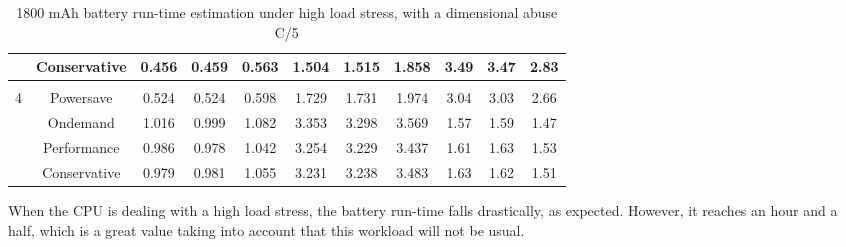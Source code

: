 \begin{table}[H]
\begin{tabular}{ccccccccccc}
\multicolumn{1}{l|}{}  & \multicolumn{1}{l}{Conservative} & \multicolumn{1}{l}{0.456} & \multicolumn{1}{l}{0.459} & \multicolumn{1}{l|}{{\color[HTML]{FE0000} 0.563}} & \multicolumn{1}{l}{1.504} & \multicolumn{1}{l}{1.515} & \multicolumn{1}{l|}{{\color[HTML]{FE0000} 1.858}} & \multicolumn{1}{l}{3.49} & \multicolumn{1}{l}{3.47} & \multicolumn{1}{l}{{\color[HTML]{FE0000} 2.83}} \\ \hline
\multicolumn{1}{l}{}   & \multicolumn{1}{l}{}             & \multicolumn{1}{l}{}      & \multicolumn{1}{l}{}      & \multicolumn{1}{l|}{{\color[HTML]{FE0000} }}      & \multicolumn{1}{l}{}      & \multicolumn{1}{l}{}      & \multicolumn{1}{l|}{{\color[HTML]{FE0000} }}      & \multicolumn{1}{l}{}     & \multicolumn{1}{l}{}     & \multicolumn{1}{l}{{\color[HTML]{FE0000} }}     \\
\multicolumn{1}{c|}{4} & Powersave                        & 0.524                     & 0.524                     & \multicolumn{1}{c|}{{\color[HTML]{FE0000} 0.598}} & 1.729                     & 1.731                     & \multicolumn{1}{c|}{{\color[HTML]{FE0000} 1.974}} & 3.04                     & 3.03                     & {\color[HTML]{FE0000} 2.66}                     \\
\multicolumn{1}{c|}{}  & Ondemand                         & 1.016                     & 0.999                     & \multicolumn{1}{c|}{{\color[HTML]{FE0000} 1.082}} & 3.353                     & 3.298                     & \multicolumn{1}{c|}{{\color[HTML]{FE0000} 3.569}} & 1.57                     & 1.59                     & {\color[HTML]{FE0000} 1.47}                     \\
\multicolumn{1}{c|}{}  & Performance                      & 0.986                     & 0.978                     & \multicolumn{1}{c|}{{\color[HTML]{FE0000} 1.042}} & 3.254                     & 3.229                     & \multicolumn{1}{c|}{{\color[HTML]{FE0000} 3.437}} & 1.61                     & 1.63                     & {\color[HTML]{FE0000} 1.53}                     \\
\multicolumn{1}{c|}{}  & Conservative                     & 0.979                     & 0.981                     & \multicolumn{1}{c|}{{\color[HTML]{FE0000} 1.055}} & 3.231                     & 3.238                     & \multicolumn{1}{c|}{{\color[HTML]{FE0000} 3.483}} & 1.63                     & 1.62                     & {\color[HTML]{FE0000} 1.51}                     \\ \hline
\end{tabular}
\caption{1800 mAh battery run-time estimation under high load stress, with a dimensional abuse C/5}
\label{runtime2}
\end{table}
\vspace{-0.8cm}

When the \acrshort{CPU} is dealing with a high load stress, the battery run-time falls drastically, as expected. However, it reaches an hour and a half, which is a great value taking into account that this workload will not be usual.